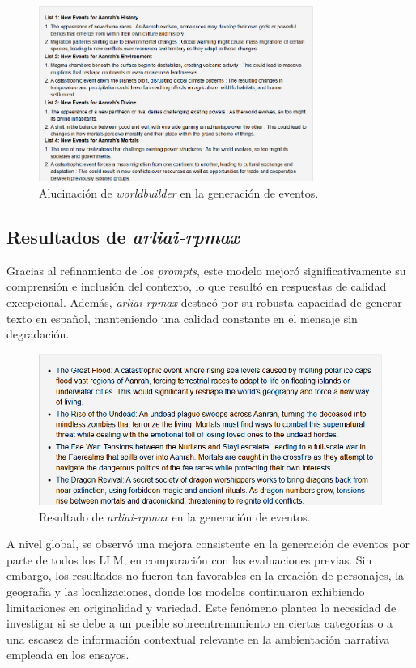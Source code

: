 \begin{figure}[htbp]
	\centering
	\includegraphics[width=0.8\textwidth]{./Figures/worldbuilder-hallucination-events.png}
	\caption{Alucinación de \textit{worldbuilder} en la generación de eventos.}
	\label{fig:worldbuilder-hallucination}
\end{figure}

\subsection{Resultados de \textit{arliai-rpmax}}
Gracias al refinamiento de los \textit{prompts},
este modelo mejoró significativamente su comprensión e inclusión del contexto,
lo que resultó en respuestas de calidad excepcional.
Además, \textit{arliai-rpmax} destacó por su robusta capacidad de generar texto en español,
manteniendo una calidad constante en el mensaje sin degradación.

\begin{figure}[htbp]
	\centering
	\includegraphics[width=1\textwidth]{./Figures/rpmax-prompt-events.png}
	\caption{Resultado de \textit{arliai-rpmax} en la generación de eventos.}
	\label{fig:rpmax-events}
\end{figure}

A nivel global, se observó una mejora consistente en la generación de eventos por parte de todos los LLM,
en comparación con las evaluaciones previas.
Sin embargo, los resultados no fueron tan favorables en la creación de personajes,
la geografía y las localizaciones,
donde los modelos continuaron exhibiendo limitaciones en originalidad y variedad.
Este fenómeno plantea la necesidad de investigar si se debe a un posible sobreentrenamiento en ciertas categorías
o a una escasez de información contextual relevante en la ambientación narrativa empleada en los ensayos.

